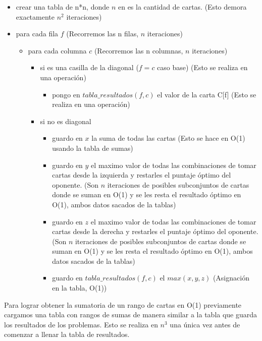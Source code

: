 \begin{itemize}
\item crear una tabla de n*n, donde $n$ en es la cantidad de cartas. (Esto demora exactamente $n^2$ iteraciones)
\item para cada fila $f$ (Recorremos las n filas, $n$ iteraciones)
	\begin{itemize}
	\item para cada columna $c$ (Recorremos las n columnas, $n$ iteraciones)
		\begin{itemize}
			\item si es una casilla de la diagonal ($f = c$ caso base) (Esto se realiza en una operaci\'on)
				\begin{itemize}
				\item pongo en $tabla\_resultados(f,c)$ el valor de la carta C[f] (Esto se realiza en una operaci\'on)
				\end{itemize}
			\item si no es diagonal
				\begin{itemize}
				\item guardo en $x$ la suma de todas las cartas (Esto se hace en O(1) usando la tabla de sumas)
				\item guardo en $y$ el maximo valor de todas las combinaciones de tomar cartas desde la izquierda y restarles el puntaje \'optimo del oponente. (Son $n$ iteraciones de posibles subconjuntos de cartas donde se suman en O(1) y se les resta el resultado \'optimo en O(1), ambos datos sacados de la tablas)
				\item guardo en $z$ el maximo valor de todas las combinaciones de tomar cartas desde la derecha y restarles el puntaje \'optimo del oponente. (Son $n$ iteraciones de posibles subconjuntos de cartas donde se suman en O(1) y se les resta el resultado \'optimo en O(1), ambos datos sacados de la tablas)
				\item guardo en $tabla\_resultados(f,c)$ el $max(x,y,z)$ (Asignaci\'on en la tabla, O(1))
				\end{itemize}
		\end{itemize}
	\end{itemize}
\end{itemize}

Para lograr obtener la sumatoria de un rango de cartas en O(1) previamente cargamos una tabla con rangos de sumas de manera similar a la tabla que guarda los resultados de los problemas. Esto se realiza en $n^3$ una \'unica vez antes de comenzar a llenar la tabla de resultados. \\

